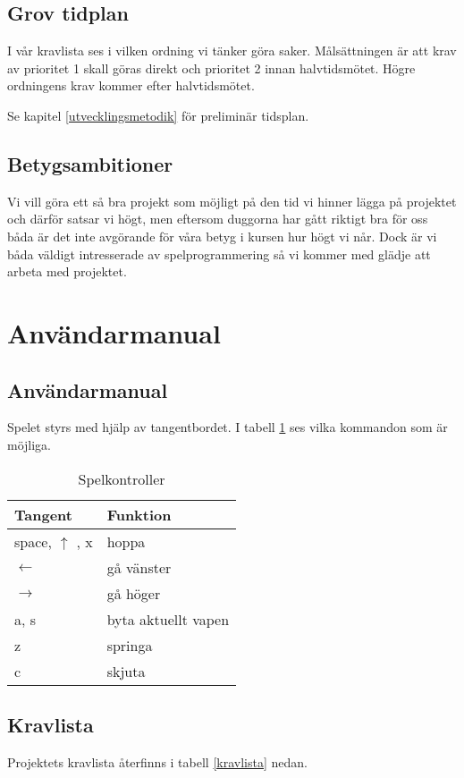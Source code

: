 \documentclass{scrartcl}
\begin{document}
\subsection{Grov tidplan}
I vår kravlista ses i vilken ordning vi tänker göra saker. Målsättningen är att krav av prioritet 1 skall göras direkt och prioritet 2 innan halvtidsmötet. Högre ordningens krav kommer efter halvtidsmötet.

Se kapitel \ref{utvecklingsmetodik} för preliminär tidsplan.

\subsection{Betygsambitioner}
Vi vill göra ett så bra projekt som möjligt på den tid vi hinner lägga på projektet och därför satsar vi högt, men eftersom duggorna har gått riktigt bra för oss båda är det inte avgörande för våra betyg i kursen hur högt vi når. Dock är vi båda väldigt intresserade av spelprogrammering så vi kommer med glädje att arbeta med projektet.

\section{Användarmanual}
\subsection{Användarmanual}

Spelet styrs med hjälp av tangentbordet. I tabell \ref{kontroller} ses vilka kommandon som är möjliga. 

\begin{table}[ht]
\caption{Spelkontroller}\label{kontroller}
\centering
    \begin{tabular}{ll}
    \toprule
    Tangent  & Funktion \\
    \midrule
    space, $\uparrow$ , x & hoppa \\
    $\leftarrow$  & gå vänster   \\
    $\rightarrow$ & gå höger     \\
    a, s     & byta aktuellt vapen \\
    z        & springa      \\
    c        & skjuta         \\
    \bottomrule
    \end{tabular}
\end{table}


\subsection{Kravlista}
Projektets kravlista återfinns i tabell \ref{kravlista} nedan.
\end{document}
